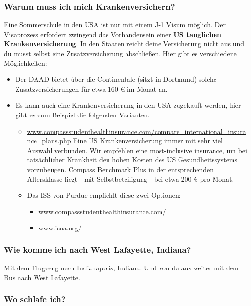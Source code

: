 \documentclass[
  paper=a4,
  fontsize=12pt,
  DIV=16,
  headheight=52pt,
  footheight=45pt,
  headinclude,
  parskip=full,
]{scrartcl}
\begin{document}
\subsubsection*{Warum muss ich mich Krankenversichern?}
Eine Sommerschule in den USA ist nur mit einem J-1 Visum möglich.
Der Visaprozess erfordert zwingend das Vorhandensein einer
\textbf{US tauglichen Krankenversicherung}.
In den Staaten reicht deine Versicherung nicht aus und du musst selbst eine
Zusatzversicherung abschließen.
Hier gibt es verschiedene Möglichkeiten:
\begin{itemize}
  \item Der DAAD bietet über die Continentale (sitzt in Dortmund) solche
  Zusatzversicherungen für etwa 160 € im Monat an.
  \item Es kann auch eine Krankenversicherung in den USA zugekauft werden, hier
  gibt es zum Beispiel die folgenden Varianten:
  \begin{itemize}
    \item \url{www.compassstudenthealthinsurance.com/compare_international_insurance_plans.php}
    Eine US Krankenversicherung immer mit sehr viel Auswahl verbunden.
    Wir empfehlen eine most-inclusive insurance, um bei tatsächlicher Krankheit
    den hohen Kosten des US Gesundheitssystems vorzubeugen.
    Compass Benchmark Plus in der entsprechenden Altersklasse liegt - mit
    Selbstbeteiligung - bei etwa 200 € pro Monat.
    \item Das ISS von Purdue empfiehlt diese zwei Optionen:
    \begin{itemize}
      \item \url{www.compassstudenthealthinsurance.com/}
      \item \url{www.isoa.org/}
    \end{itemize}
  \end{itemize}
\end{itemize}

\subsubsection*{Wie komme ich nach West Lafayette, Indiana?}
Mit dem Flugzeug nach Indianapolis, Indiana. Und von da aus weiter mit dem Bus
nach West Lafayette.

\subsubsection*{Wo schlafe ich?}
\end{document}
